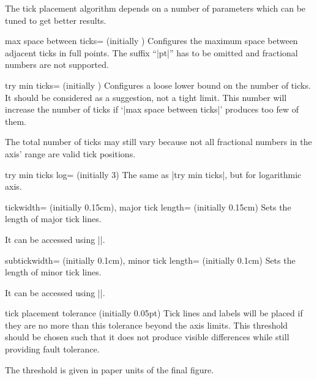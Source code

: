 The tick placement algorithm depends on a number of parameters which can be
tuned to get better results.

\begin{pgfplotskey}{max space between ticks= (initially \axisdefaulttickwidth)}
\label{maxspacebetweenticks}
    Configures the maximum space between adjacent ticks in full points. The
    suffix ``|pt|'' has to be omitted and fractional numbers are not supported.
\end{pgfplotskey}

\begin{pgfplotskey}{try min ticks= (initially \axisdefaulttryminticks)}
    Configures a loose lower bound on the number of ticks. It should be
    considered as a suggestion, not a tight limit. This number will increase
    the number of ticks if `|max space between ticks|' produces too few of
    them.

    The total number of ticks may still vary because not all fractional numbers
    in the axis' range are valid tick positions.
\end{pgfplotskey}

\begin{pgfplotskey}{try min ticks log= (initially 3)}
    The same as |try min ticks|, but for logarithmic axis.
\end{pgfplotskey}

\begin{pgfplotskeylist}{%
    tickwidth= (initially 0.15cm),
    major tick length= (initially 0.15cm)%
}
    Sets the length of major tick lines.

    It can be accessed using ||.
\end{pgfplotskeylist}

\begin{pgfplotskeylist}{%
    subtickwidth= (initially 0.1cm),
    minor tick length= (initially 0.1cm)%
}
    Sets the length of minor tick lines.

    It can be accessed using ||.
\end{pgfplotskeylist}

\begin{pgfplotsxykeylist}{\x tick placement tolerance (initially 0.05pt)}
    Tick lines and labels will be placed if they are no more than this
    tolerance beyond the axis limits. This threshold should be chosen such that
    it does not produce visible differences while still providing fault
    tolerance.

    The threshold is given in paper units of the final figure.
\end{pgfplotsxykeylist}

